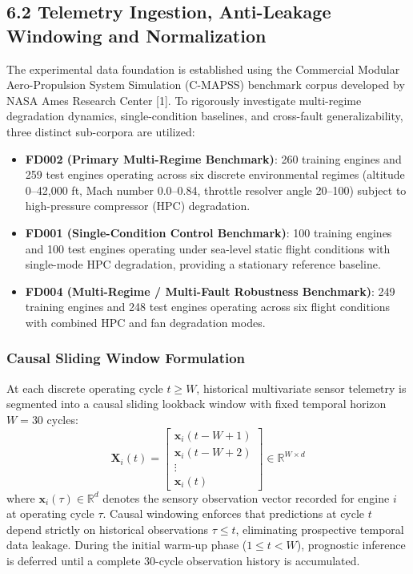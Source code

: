 \documentclass[12pt,a4paper]{article}
\begin{document}
\subsection*{6.2 Telemetry Ingestion, Anti-Leakage Windowing and Normalization}
The experimental data foundation is established using the Commercial Modular Aero-Propulsion System Simulation (C-MAPSS) benchmark corpus developed by NASA Ames Research Center [1]. To rigorously investigate multi-regime degradation dynamics, single-condition baselines, and cross-fault generalizability, three distinct sub-corpora are utilized:
\begin{itemize}
    \item \textbf{FD002 (Primary Multi-Regime Benchmark)}: 260 training engines and 259 test engines operating across six discrete environmental regimes (altitude 0--42,000 ft, Mach number 0.0--0.84, throttle resolver angle 20--100) subject to high-pressure compressor (HPC) degradation.
    \item \textbf{FD001 (Single-Condition Control Benchmark)}: 100 training engines and 100 test engines operating under sea-level static flight conditions with single-mode HPC degradation, providing a stationary reference baseline.
    \item \textbf{FD004 (Multi-Regime / Multi-Fault Robustness Benchmark)}: 249 training engines and 248 test engines operating across six flight conditions with combined HPC and fan degradation modes.
\end{itemize}

\subsubsection*{Causal Sliding Window Formulation}
At each discrete operating cycle $t \ge W$, historical multivariate sensor telemetry is segmented into a causal sliding lookback window with fixed temporal horizon $W = 30$ cycles:
\begin{equation}
\mathbf{X}_i(t) = \begin{bmatrix}
\mathbf{x}_i(t - W + 1) \\
\mathbf{x}_i(t - W + 2) \\
\vdots \\
\mathbf{x}_i(t)
\end{bmatrix} \in \mathbb{R}^{W \times d}
\end{equation}
where $\mathbf{x}_i(\tau) \in \mathbb{R}^d$ denotes the sensory observation vector recorded for engine $i$ at operating cycle $\tau$. Causal windowing enforces that predictions at cycle $t$ depend strictly on historical observations $\tau \le t$, eliminating prospective temporal data leakage. During the initial warm-up phase ($1 \le t < W$), prognostic inference is deferred until a complete 30-cycle observation history is accumulated.
\end{document}
